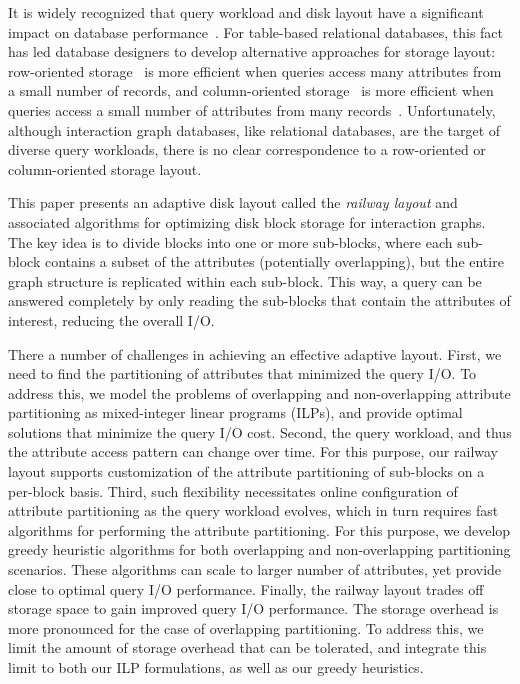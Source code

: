 It is widely recognized that query workload and disk layout have a significant
impact on database performance~\cite{alagiannis14,grund10,stonebraker05}.  For
table-based relational databases, this fact has led database designers to
develop alternative approaches for storage layout: row-oriented
storage~\cite{rowOrg} is more efficient when queries access many attributes
from a small number of records, and column-oriented storage~\cite{colOrg} is
more efficient when queries access a small number of attributes from many
records~\cite{stonebraker05}.  Unfortunately, although interaction graph
databases, like relational databases, are the target of diverse query
workloads, there is no clear correspondence to a row-oriented or
column-oriented storage layout.

This paper presents an adaptive disk layout called the \emph{railway layout}
and associated algorithms for optimizing disk block storage for interaction
graphs. The key idea is to divide blocks into one or more sub-blocks, where
each sub-block contains a subset of the attributes (potentially overlapping),
but the entire graph structure is replicated within each sub-block. This way,
a query can be answered completely by only reading the sub-blocks that contain
the attributes of interest, reducing the overall I/O. 

There a number of challenges in achieving an effective adaptive layout. First,
we need to find the partitioning of attributes that minimized the query I/O.
To address this, we model the problems of overlapping and non-overlapping
attribute partitioning as mixed-integer linear programs (ILPs), and provide
optimal solutions that minimize the query I/O cost. Second, the query
workload, and thus the attribute access pattern can change over time. For this
purpose, our railway layout supports customization of the attribute
partitioning of sub-blocks on a per-block basis. Third, such flexibility
necessitates online configuration of attribute partitioning as the query
workload evolves, which in turn requires fast algorithms for performing the
attribute partitioning. For this purpose, we develop greedy heuristic
algorithms for both overlapping and non-overlapping partitioning scenarios.
These algorithms can scale to larger number of attributes, yet provide close
to optimal query I/O performance. Finally, the railway layout trades off
storage space to gain improved query I/O performance. The storage overhead is
more pronounced for the case of overlapping partitioning. To address this, we
limit the amount of storage  overhead that can be tolerated, and integrate
this limit to both our ILP formulations, as well as our greedy heuristics.

